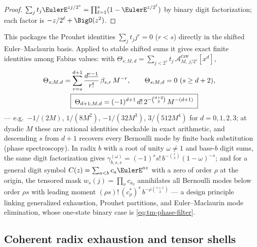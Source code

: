\documentclass[11pt,oneside]{article}
\numberwithin{equation}{section}
\theoremstyle{definition}
\theoremstyle{remark}
\newcommand{\fall}[2]{#1^{\underline{#2}}}
\begin{document}
\begin{proof}
$\sum_j t_j\EulerE^{zj/2^{s}}=\prod_{\ell=1}^{s}(1-\EulerE^{z/2^{\ell}})$ by
binary digit factorization; each factor is
$-z/2^{\ell}+\BigO(z^{2})$.
\end{proof}

This packages the Prouhet identities $\sum_jt_jj^{r}=0$ ($r<s$)
directly in the shifted Euler--Maclaurin basis.  Applied to stable
shifted sums it gives exact finite identities among Fabius values:
with $\Theta_{s;M,d}=\sum_{j<2^{s}}t_j\,
\mathcal A^{\mathrm{raw}}_{M,\,j/2^{s}}[x^{d}]$,
\begin{align}
 \Theta_{s;M,d}
 &=\sum_{r=s}^{d+1}\frac{\fall d{r-1}}{r!}\,\beta_{s,r}\,M^{-r},
 \qquad
 \Theta_{s;M,d}=0\ (s\ge d+2),
 \notag\\
 &\phantom{=}\;
 \boxed{\;\Theta_{d+1;M,d}
 =(-1)^{d+1}\,d!\,2^{-\binom{d+2}2}\,M^{-(d+1)}\;}
 \label{eq:tm-phase-filter}
\end{align}
--- e.g.\ $-1/(2M)$, $1/(8M^{2})$, $-1/(32M^{3})$, $3/(512M^{4})$ for
$d=0,1,2,3$; at dyadic $M$ these are rational identities checkable in
exact arithmetic, and descending $s$ from $d+1$ recovers every
Bernoulli mode by finite back substitution (phase spectroscopy).  In
radix $b$ with a root of unity $\omega\ne1$ and base-$b$ digit sums,
the same digit factorization gives
$\gamma_{b,s,s}^{(\omega)}=(-1)^{s}s!\,b^{-\binom s2}(1-\omega)^{-s}$;
and for a general digit symbol
$C(z)=\sum_{a<b}c_a\EulerE^{az}$ with a zero of order $\rho$ at the
origin, the tensored mask
$w_s(j)=\prod_\nu c_{a_\nu}$ annihilates all Bernoulli modes below
order $\rho s$ with leading moment
$(\rho s)!\,(c^{*}_{\rho})^{s}\,b^{-\rho\binom{s+1}2}$ --- a design
principle linking generalized exhaustion, Prouhet partitions, and
Euler--Maclaurin mode elimination, whose one-state binary case is
\eqref{eq:tm-phase-filter}.

\subsection{Coherent radix exhaustion and tensor shells}
\end{document}
